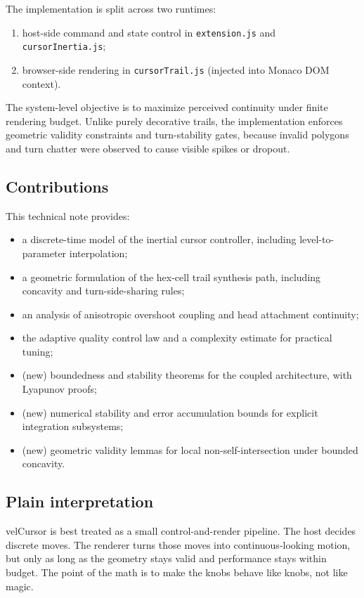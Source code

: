 \documentclass[journal]{IEEEtran}
\begin{document}
The implementation is split across two runtimes:
\begin{enumerate}
	\item host-side command and state control in \texttt{extension.js} and \texttt{cursorInertia.js};
	\item browser-side rendering in \texttt{cursorTrail.js} (injected into Monaco DOM context).
\end{enumerate}

The system-level objective is to maximize perceived continuity under finite rendering budget. Unlike purely decorative trails, the implementation enforces geometric validity constraints and turn-stability gates, because invalid polygons and turn chatter were observed to cause visible spikes or dropout.

\subsection{Contributions}
This technical note provides:
\begin{itemize}
	\item a discrete-time model of the inertial cursor controller, including level-to-parameter interpolation;
	\item a geometric formulation of the hex-cell trail synthesis path, including concavity and turn-side-sharing rules;
	\item an analysis of anisotropic overshoot coupling and head attachment continuity;
	\item the adaptive quality control law and a complexity estimate for practical tuning;
	\item (new) boundedness and stability theorems for the coupled architecture, with Lyapunov proofs;
	\item (new) numerical stability and error accumulation bounds for explicit integration subsystems;
	\item (new) geometric validity lemmas for local non-self-intersection under bounded concavity.
\end{itemize}

\subsection{Plain interpretation}
velCursor is best treated as a small control-and-render pipeline. The host decides discrete moves. The renderer turns those moves into continuous-looking motion, but only as long as the geometry stays valid and performance stays within budget. The point of the math is to make the knobs behave like knobs, not like magic.
\end{document}
